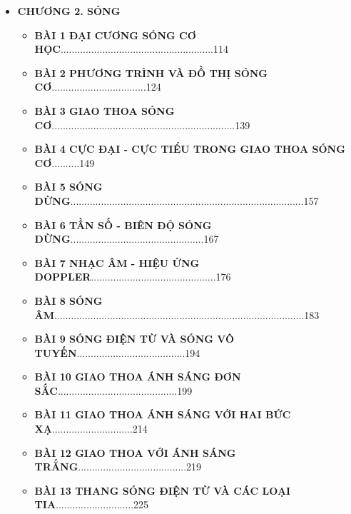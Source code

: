 \begin{itemize}
\begin{itemize}
\item[] \textbf{\textcolor{coolblack}{BÀI 14} NĂNG LƯỢNG CỦA CON LẮC ĐƠN}.........................................\hfill 94
\item[] \textbf{\textcolor{coolblack}{BÀI 15} BÀI TOÁN THỜI GIAN - LOẠI 3}.................................................\hfill 99
\item[] \textbf{\textcolor{coolblack}{BÀI 16} CÁC LOẠI DAO ĐỘNG}..................................................................\hfill 103
\end{itemize}
\vspace*{2\baselineskip}
\item[] \textcolor{coolblack}{\textbf{CHƯƠNG 2. SÓNG}}
\vspace*{.5\baselineskip}
\begin{itemize}
\item[] \textbf{\textcolor{coolblack}{BÀI 1} ĐẠI CƯƠNG SÓNG CƠ HỌC}.......................................................\hfill 114
\item[] \textbf{\textcolor{coolblack}{BÀI 2} PHƯƠNG TRÌNH VÀ ĐỒ THỊ SÓNG CƠ}..................................\hfill 124
\item[] \textbf{\textcolor{coolblack}{BÀI 3} GIAO THOA SÓNG CƠ}..................................................................\hfill 139
\item[] \textbf{\textcolor{coolblack}{BÀI 4} CỰC ĐẠI - CỰC TIỂU TRONG GIAO THOA SÓNG CƠ}..........\hfill 149
\item[] \textbf{\textcolor{coolblack}{BÀI 5} SÓNG DỪNG}....................................................................................\hfill 157
\item[] \textbf{\textcolor{coolblack}{BÀI 6} TẦN SỐ - BIÊN ĐỘ SÓNG DỪNG}................................................\hfill 167
\item[] \textbf{\textcolor{coolblack}{BÀI 7} NHẠC ÂM - HIỆU ỨNG DOPPLER}.............................................\hfill 176
\item[] \textbf{\textcolor{coolblack}{BÀI 8} SÓNG ÂM}..........................................................................................\hfill 183
\item[] \textbf{\textcolor{coolblack}{BÀI 9} SÓNG ĐIỆN TỪ VÀ SÓNG VÔ TUYẾN}.......................................\hfill 194
\item[] \textbf{\textcolor{coolblack}{BÀI 10} GIAO THOA ÁNH SÁNG ĐƠN SẮC}...........................................\hfill 199
\item[] \textbf{\textcolor{coolblack}{BÀI 11} GIAO THOA ÁNH SÁNG VỚI HAI BỨC XẠ}.............................\hfill 214
\item[] \textbf{\textcolor{coolblack}{BÀI 12} GIAO THOA VỚI ÁNH SÁNG TRẮNG}.......................................\hfill 219
\item[] \textbf{\textcolor{coolblack}{BÀI 13} THANG SÓNG ĐIỆN TỪ VÀ CÁC LOẠI TIA}............................\hfill 225
\end{itemize}
\end{itemize}



